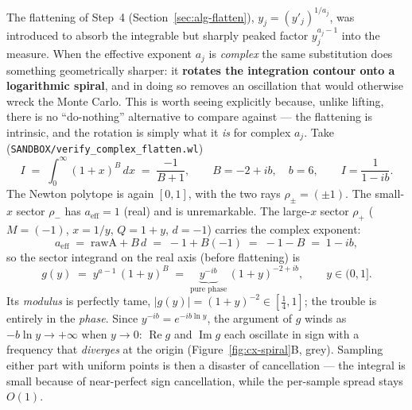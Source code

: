 \documentclass[11pt,a4paper]{article}
\begin{document}
The flattening of Step~4 (Section~\ref{sec:alg-flatten}),
$y_j = (y'_j)^{1/a_j}$, was introduced to absorb the integrable but sharply
peaked factor $y_j^{a_j-1}$ into the measure. When the effective exponent
$a_j$ is \emph{complex} the same substitution does something geometrically
sharper: it \textbf{rotates the integration contour onto a logarithmic spiral},
and in doing so removes an oscillation that would otherwise wreck the Monte
Carlo. This is worth seeing explicitly because, unlike lifting, there is no
``do-nothing'' alternative to compare against --- the flattening is intrinsic,
and the rotation is simply what it \emph{is} for complex $a_j$. Take
(\texttt{SANDBOX/verify\_complex\_flatten.wl})
\begin{equation}\label{eq:cx-int}
I \;=\; \int_0^\infty (1+x)^{B}\,dx \;=\; \frac{-1}{B+1},
\qquad B = -2 + i b,\quad b=6,\qquad I = \frac{1}{1-ib}.
\end{equation}
The Newton polytope is again $[0,1]$, with the two rays $\rho_\pm=(\pm1)$. The
small-$x$ sector $\rho_-$ has $a_{\mathrm{eff}}=1$ (real) and is unremarkable.
The large-$x$ sector $\rho_+$ ($M=(-1)$, $x=1/y$, $Q=1+y$, $d=-1$) carries the
complex exponent:
\begin{equation}
a_{\mathrm{eff}} \;=\; \mathrm{rawA} + B\,d \;=\; -1 + B(-1) \;=\; -1-B \;=\; 1 - i b,
\end{equation}
so the sector integrand on the real axis (before flattening) is
\begin{equation}\label{eq:cx-g}
g(y) \;=\; y^{a-1}\,(1+y)^{B}
       \;=\; \underbrace{y^{-i b}}_{\text{pure phase}}\,(1+y)^{-2+i b},
\qquad y\in(0,1].
\end{equation}
Its \emph{modulus} is perfectly tame, $|g(y)| = (1+y)^{-2}\in[\tfrac14,1]$;
the trouble is entirely in the \emph{phase}. Since $y^{-ib}=e^{-i b\ln y}$, the
argument of $g$ winds as $-b\ln y \to +\infty$ when $y\to0$: $\operatorname{Re}g$
and $\operatorname{Im}g$ each oscillate in sign with a frequency that
\emph{diverges} at the origin (Figure~\ref{fig:cx-spiral}B, grey). Sampling
either part with uniform points is then a disaster of cancellation --- the
integral is small because of near-perfect sign cancellation, while the
per-sample spread stays $O(1)$.
\end{document}
